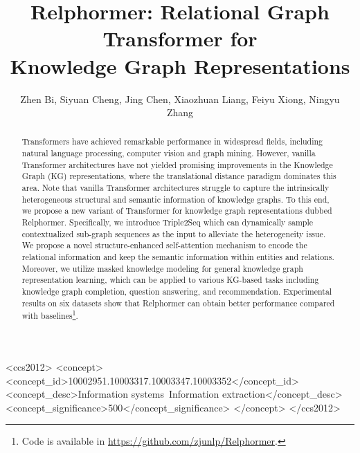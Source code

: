 \documentclass[sigconf]{acmart}
\begin{document}
\acmBooktitle{}


\title{Relphormer: Relational Graph Transformer for\\ Knowledge Graph Representations}

\author{
Zhen Bi, 
Siyuan Cheng, 
Jing Chen, 
Xiaozhuan Liang, 
Feiyu Xiong, 
Ningyu Zhang
}





\begin{abstract}
Transformers have achieved remarkable performance in widespread fields, including natural language processing, computer vision and graph mining. However, vanilla Transformer architectures have not yielded promising improvements in the Knowledge Graph (KG) representations, where the translational distance paradigm dominates this area. Note that vanilla Transformer architectures struggle to capture the intrinsically heterogeneous structural and semantic information of knowledge graphs. To this end, we propose a new variant of Transformer for knowledge graph representations dubbed Relphormer. Specifically, we introduce Triple2Seq which can dynamically sample contextualized sub-graph sequences as the input to alleviate the heterogeneity issue. We propose a novel structure-enhanced self-attention mechanism to encode the relational information and keep the semantic information within entities and relations. Moreover, we utilize masked knowledge modeling for general knowledge graph representation learning, which can be applied to various KG-based tasks including knowledge graph completion, question answering, and recommendation. Experimental results on six datasets show that Relphormer can obtain better performance compared with baselines\footnote{Code is available in \url{https://github.com/zjunlp/Relphormer}.}.


\end{abstract}

\begin{CCSXML}
<ccs2012>
<concept>
<concept_id>10002951.10003317.10003347.10003352</concept_id>
<concept_desc>Information systems~Information extraction</concept_desc>
<concept_significance>500</concept_significance>
</concept>
</ccs2012>
\end{CCSXML}
\end{document}
